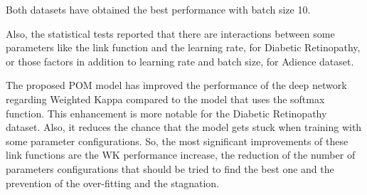 \documentclass[10pt, a4paper, titlepage, twocolumn]{article}
\begin{document}
	Both datasets have obtained the best performance with batch size 10.
	
	Also, the statistical tests reported that there are interactions between some parameters like the link function and the learning rate, for Diabetic Retinopathy, or those factors in addition to learning rate and batch size, for Adience dataset.
	
	The proposed POM model has improved the performance of the deep network regarding Weighted Kappa compared to the model that uses the softmax function. This enhancement is more notable for the Diabetic Retinopathy dataset. Also, it reduces the chance that the model gets stuck when training with some parameter configurations. So, the most significant improvements of these link functions are the WK performance increase, the reduction of the number of parameters configurations that should be tried to find the best one and the prevention of the over-fitting and the stagnation.
	
	\printbibliography
	
	
\end{document}
